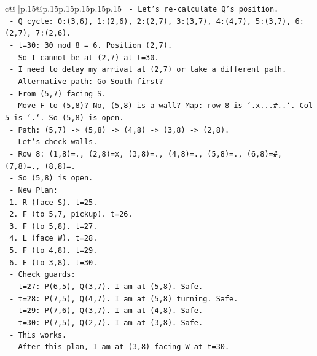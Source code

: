 \documentclass{article}
\begin{document}
{\begin{supertabular}{c@{$\;$}|p{.15\linewidth}@{}p{.15\linewidth}p{.15\linewidth}p{.15\linewidth}p{.15\linewidth}p{.15\linewidth}}
{{{\texttt{     {-} Let's re{-}calculate Q's position.} \\
\texttt{       {-} Q cycle: 0:(3,6), 1:(2,6), 2:(2,7), 3:(3,7), 4:(4,7), 5:(3,7), 6:(2,7), 7:(2,6).} \\
\texttt{       {-} t=30: 30 mod 8 = 6. Position (2,7).} \\
\texttt{     {-} So I cannot be at (2,7) at t=30.} \\
\texttt{     {-} I need to delay my arrival at (2,7) or take a different path.} \\
\texttt{     {-} Alternative path: Go South first?} \\
\texttt{       {-} From (5,7) facing S.} \\
\texttt{       {-} Move F to (5,8)? No, (5,8) is a wall? Map: row 8 is `.x...\#..`. Col 5 is `.`. So (5,8) is open.} \\
\texttt{       {-} Path: (5,7) {-}> (5,8) {-}> (4,8) {-}> (3,8) {-}> (2,8).} \\
\texttt{       {-} Let's check walls.} \\
\texttt{         {-} Row 8: (1,8)=., (2,8)=x, (3,8)=., (4,8)=., (5,8)=., (6,8)=\#, (7,8)=., (8,8)=.} \\
\texttt{         {-} So (5,8) is open.} \\
\texttt{       {-} New Plan:} \\
\texttt{         1. R (face S). t=25.} \\
\texttt{         2. F (to 5,7, pickup). t=26.} \\
\texttt{         3. F (to 5,8). t=27.} \\
\texttt{         4. L (face W). t=28.} \\
\texttt{         5. F (to 4,8). t=29.} \\
\texttt{         6. F (to 3,8). t=30.} \\
\texttt{       {-} Check guards:} \\
\texttt{         {-} t=27: P(6,5), Q(3,7). I am at (5,8). Safe.} \\
\texttt{         {-} t=28: P(7,5), Q(4,7). I am at (5,8) turning. Safe.} \\
\texttt{         {-} t=29: P(7,6), Q(3,7). I am at (4,8). Safe.} \\
\texttt{         {-} t=30: P(7,5), Q(2,7). I am at (3,8). Safe.} \\
\texttt{       {-} This works.} \\
\texttt{       {-} After this plan, I am at (3,8) facing W at t=30.} \\
}}}
\end{supertabular}}
\end{document}
